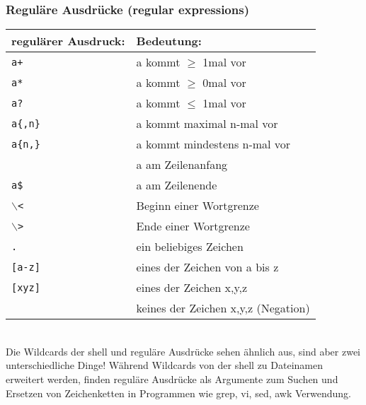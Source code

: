\documentclass[11pt]{article}
\begin{document}
\subsubsection{Reguläre Ausdrücke (regular expressions)}
\begin{tabular}{|l|l|}
\hline
regulärer Ausdruck: & Bedeutung:\\
\hline
\texttt{a+} & a kommt $\ge$ 1mal vor \\
\texttt{a*} & a kommt $\ge$ 0mal vor \\
\texttt{a?} & a kommt $\le$ 1mal vor \\
\texttt{a\{,n\}} & a kommt maximal n-mal vor \\
\texttt{a\{n,\}} & a kommt mindestens n-mal vor \\
\verb1^a1 & a am Zeilenanfang \\
\texttt{a\$} & a am Zeilenende \\
\texttt{$\backslash$<} & Beginn einer Wortgrenze \\
\texttt{$\backslash$>} & Ende einer Wortgrenze \\
\texttt{.} & ein beliebiges Zeichen \\
\texttt{[a-z]} & eines der Zeichen von a bis z \\
\texttt{[xyz]} & eines der Zeichen x,y,z \\
\verb1[^xyz]1 & keines der Zeichen x,y,z (Negation)\\
\hline
\end{tabular}\\

Die Wildcards der shell und reguläre Ausdrücke  sehen ähnlich aus,
sind aber zwei unterschiedliche Dinge! Während Wildcards von der shell
zu Dateinamen erweitert werden, finden reguläre Ausdrücke als Argumente
zum Suchen und Ersetzen von Zeichenketten in Programmen wie grep, vi, sed,
awk Verwendung.\\  
\end{document}
